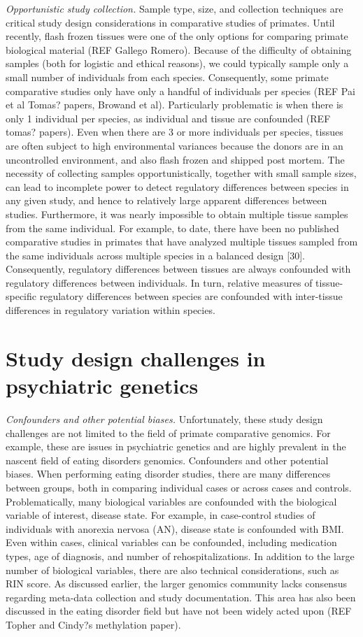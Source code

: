 \textit{Opportunistic study collection.} Sample type, size, and collection techniques are critical study design considerations in comparative studies of primates. Until recently, flash frozen tissues were one of the only options for comparing primate biological material (REF Gallego Romero). Because of the difficulty of obtaining samples (both for logistic and ethical reasons), we could typically sample only a small number of individuals from each species. Consequently, some primate comparative studies only have only a handful of individuals per species (REF Pai et al Tomas? papers, Browand et al). Particularly problematic is when there is only 1 individual per species, as individual and tissue are confounded (REF tomas? papers). 
Even when there are 3 or more individuals per species, tissues are often subject to high environmental variances because the donors are in an uncontrolled environment, and also flash frozen and shipped post mortem. The necessity of collecting samples opportunistically, together with small sample sizes, can lead to incomplete power to detect regulatory differences between species in any given study, and hence to relatively large apparent differences between studies.
 Furthermore, it was nearly impossible to obtain multiple tissue samples from the same individual. For example, to date, there have been no published comparative studies in primates that have analyzed multiple tissues sampled from the same individuals across multiple species in a balanced design [30]. Consequently, regulatory differences between tissues are always confounded with regulatory differences between individuals. In turn, relative measures of tissue-specific regulatory differences between species are confounded with inter-tissue differences in regulatory variation within species. 	

\section{Study design challenges in psychiatric genetics}
\textit{Confounders and other potential biases.} 
Unfortunately, these study design challenges are not limited to the field of primate comparative genomics. For example, these are issues in psychiatric genetics and are highly prevalent in the nascent field of eating disorders genomics. 
Confounders and other potential biases. When performing eating disorder studies, there are many differences between groups, both in comparing individual cases or across cases and controls. Problematically, many biological variables are confounded with the biological variable of interest, disease state. For example, in case-control studies of individuals with anorexia nervosa (AN), disease state is confounded with BMI. Even within cases, clinical variables can be confounded, including medication types, age of diagnosis, and number of rehospitalizations. In addition to the large number of biological variables, there are also technical considerations, such as RIN score. As discussed earlier, the larger genomics community lacks consensus regarding meta-data collection and study documentation. This area has also been discussed in the eating disorder field but have not been widely acted upon (REF Topher and Cindy?s methylation paper). 

